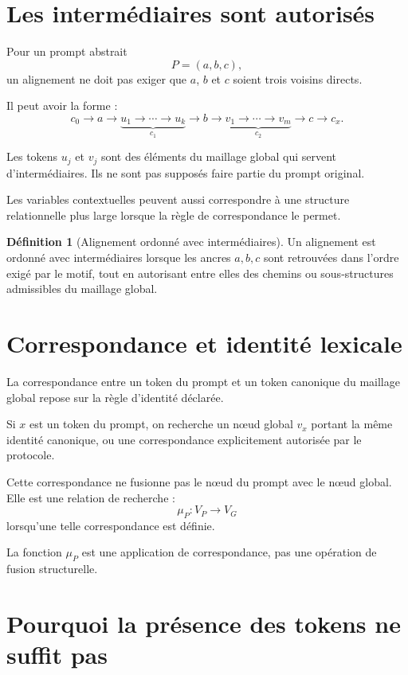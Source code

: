 \documentclass[11pt,a4paper]{report}
\theoremstyle{definition}
\newtheorem{definition}{Définition}[chapter]
\theoremstyle{plain}
\theoremstyle{remark}
\begin{document}
\section{Les intermédiaires sont autorisés}

Pour un prompt abstrait
\[
P=(a,b,c),
\]
un alignement ne doit pas exiger que \(a\), \(b\) et \(c\)
soient trois voisins directs.

Il peut avoir la forme :
\[
c_0\to a\to
\underbrace{u_1\to\cdots\to u_k}_{c_1}
\to b\to
\underbrace{v_1\to\cdots\to v_m}_{c_2}
\to c\to c_x.
\]

Les tokens \(u_j\) et \(v_j\) sont des éléments du maillage
global qui servent d'intermédiaires. Ils ne sont pas supposés
faire partie du prompt original.

Les variables contextuelles peuvent aussi correspondre à une
structure relationnelle plus large lorsque la règle de
correspondance le permet.

\begin{definition}[Alignement ordonné avec intermédiaires]
Un alignement est ordonné avec intermédiaires lorsque les ancres
\(a,b,c\) sont retrouvées dans l'ordre exigé par le motif, tout
en autorisant entre elles des chemins ou sous-structures
admissibles du maillage global.
\end{definition}

\section{Correspondance et identité lexicale}

La correspondance entre un token du prompt et un token canonique
du maillage global repose sur la règle d'identité déclarée.

Si \(x\) est un token du prompt, on recherche un nœud global
\(v_x\) portant la même identité canonique, ou une correspondance
explicitement autorisée par le protocole.

Cette correspondance ne fusionne pas le nœud du prompt avec le
nœud global. Elle est une relation de recherche :
\[
\mu_P:V_P\longrightarrow V_G
\]
lorsqu'une telle correspondance est définie.

La fonction \(\mu_P\) est une application de correspondance,
pas une opération de fusion structurelle.

\section{Pourquoi la présence des tokens ne suffit pas}
\end{document}
